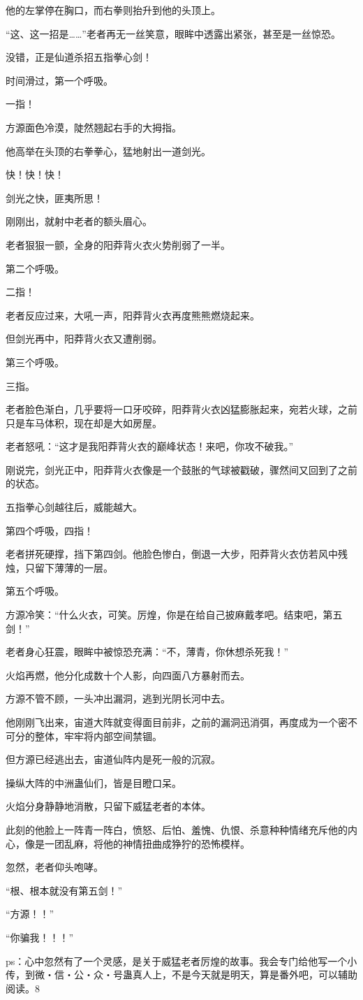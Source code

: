 \begin{this_body}
他的左掌停在胸口，而右拳则抬升到他的头顶上。

“这、这一招是……”老者再无一丝笑意，眼眸中透露出紧张，甚至是一丝惊恐。

没错，正是仙道杀招五指拳心剑！

时间滑过，第一个呼吸。

一指！

方源面色冷漠，陡然翘起右手的大拇指。

他高举在头顶的右拳拳心，猛地射出一道剑光。

快！快！快！

剑光之快，匪夷所思！

刚刚出，就射中老者的额头眉心。

老者狠狠一颤，全身的阳莽背火衣火势削弱了一半。

第二个呼吸。

二指！

老者反应过来，大吼一声，阳莽背火衣再度熊熊燃烧起来。

但剑光再中，阳莽背火衣又遭削弱。

第三个呼吸。

三指。

老者脸色渐白，几乎要将一口牙咬碎，阳莽背火衣凶猛膨胀起来，宛若火球，之前只是车马体积，现在却是大如房屋。

老者怒吼：“这才是我阳莽背火衣的巅峰状态！来吧，你攻不破我。”

刚说完，剑光正中，阳莽背火衣像是一个鼓胀的气球被戳破，骤然间又回到了之前的状态。

五指拳心剑越往后，威能越大。

第四个呼吸，四指！

老者拼死硬撑，挡下第四剑。他脸色惨白，倒退一大步，阳莽背火衣仿若风中残烛，只留下薄薄的一层。

第五个呼吸。

方源冷笑：“什么火衣，可笑。厉煌，你是在给自己披麻戴孝吧。结束吧，第五剑！”

老者身心狂震，眼眸中被惊恐充满：“不，薄青，你休想杀死我！”

火焰再燃，他分化成数十个人影，向四面八方暴射而去。

方源不管不顾，一头冲出漏洞，逃到光阴长河中去。

他刚刚飞出来，宙道大阵就变得面目前非，之前的漏洞迅消弭，再度成为一个密不可分的整体，牢牢将内部空间禁锢。

但方源已经逃出去，宙道仙阵内是死一般的沉寂。

操纵大阵的中洲蛊仙们，皆是目瞪口呆。

火焰分身静静地消散，只留下威猛老者的本体。

此刻的他脸上一阵青一阵白，愤怒、后怕、羞愧、仇恨、杀意种种情绪充斥他的内心，像是一团乱麻，将他的神情扭曲成狰狞的恐怖模样。

忽然，老者仰头咆哮。

“根、根本就没有第五剑！”

“方源！！”

“你骗我！！！”

ps：心中忽然有了一个灵感，是关于威猛老者厉煌的故事。我会专门给他写一个小传，到微・信・公・众・号蛊真人上，不是今天就是明天，算是番外吧，可以辅助阅读。8

\end{this_body}


